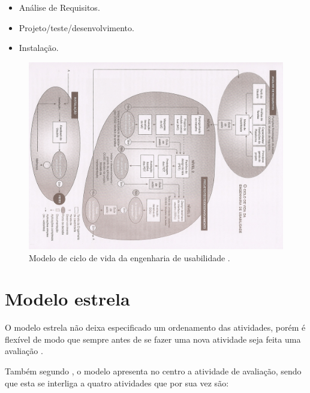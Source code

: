   \pagebreak
  
  \begin{itemize}
    \item Análise de Requisitos.

    \item Projeto/teste/desenvolvimento.

    \item Instalação.     
  \end{itemize}  
  
  
  \begin{figure}[!htb]
  \centering
  \includegraphics[scale=0.55, angle=90]{figuras/ciclovidaengusabilidade.jpg}
  \caption[Modelo de ciclo de vida da engenharia de usabilidade]{Modelo de ciclo de vida da engenharia de usabilidade \cite{ciclovidaengdeusabilidade}.}
  \end{figure}
  
  \section{Modelo estrela}
       
       O modelo estrela não deixa especificado um ordenamento das atividades, porém é flexível  de modo que sempre antes de se fazer uma nova atividade 
       seja feita uma avaliação \cite{guiaderef}.
       
       Também segundo \cite{guiaderef}, o modelo apresenta no centro a atividade de avaliação, sendo que esta se interliga a quatro atividades que 
       por sua vez são:
       
       \pagebreak
       
